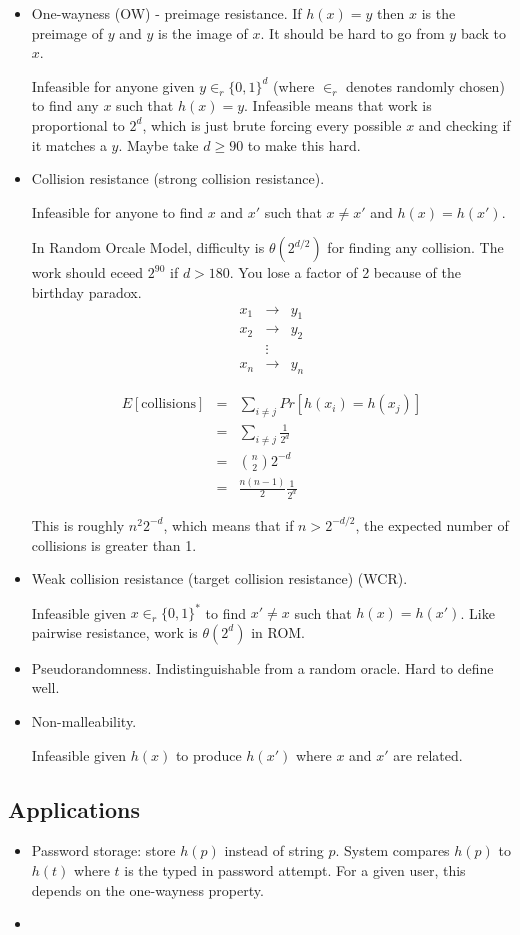 \documentclass[psamsfonts]{amsart}
\begin{document}
\begin{itemize}
\item One-wayness (OW) - preimage resistance. If $h(x) = y$ then $x$ is the preimage of $y$ and $y$ is the image of $x$. It should be hard to go from $y$ back to $x$. 

Infeasible for anyone given $y \in_{r} \{0, 1\}^d$ (where $\in_r$ denotes randomly chosen) to find any $x$ such that $h(x) = y$. Infeasible means that work is proportional to $2^d$, which is just brute forcing every possible $x$ and checking if it matches a $y$. Maybe take $d \geq 90$ to make this hard. 

\item Collision resistance (strong collision resistance).

Infeasible for anyone to find $x$ and $x'$ such that $x \neq x'$ and $h(x) = h(x')$. 

In Random Orcale Model, difficulty is $\theta(2^{d/2})$ for finding any collision. The work should eceed $2^90$ if $d > 180$. You lose a factor of 2 because of the birthday paradox.  
\begin{eqnarray}
x_1 &\to& y_1 \\
x_2 &\to& y_2 \\
&\vdots& \\
x_n &\to& y_n
\end{eqnarray}

\begin{eqnarray}
E[\textrm{collisions}] &=& \sum_{i \neq j} Pr[h(x_i) = h(x_j)] \\
&=& \sum_{i \neq j} \frac{1}{2^d} \\
&=& { {n \choose 2 } }  2^{-d} \\
&=& \frac{n (n-1)}{2} \frac{1}{2^{d}} 
\end{eqnarray}

This is roughly $n^2 2^{-d}$, which means that if $n > 2^{-d/2}$, the expected number of collisions is greater than 1.

\item Weak collision resistance (target collision resistance) (WCR).

Infeasible given $x \in_r \{0, 1\}^*$ to find $x' \neq x$ such that $h(x) = h(x')$. Like pairwise resistance, work is $\theta(2^d)$ in ROM. 

\item Pseudorandomness. Indistinguishable from a random oracle. Hard to define well. 

\item Non-malleability. 

Infeasible given $h(x)$ to produce $h(x')$ where $x$ and $x'$ are related. 
\end{itemize}

\subsection{Applications}

\begin{itemize}
\item Password storage: store $h(p)$ instead of string $p$. System compares $h(p)$ to $h(t)$ where $t$ is the typed in password attempt. For a given user, this depends on the one-wayness property. 
\item 

\end{itemize}
\end{document}

